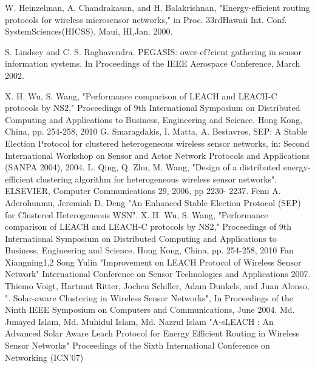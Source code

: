 \documentclass[journal]{IEEEtran}
\begin{document}
\begin{thebibliography}{1}


W. Heinzelman, A. Chandrakasan, and H. Balakrishnan, "Energy-efficient
routing protocols for wireless microsensor networks," in Proc.
33rdHawaii Int. Conf. SystemSciences(HICSS), Maui, HI,Jan. 2000.


S. Lindsey and C. S. Raghavendra. PEGASIS: ower-ef?cient gathering in sensor information systems. In Proceedings of the IEEE Aerospace Conference, March 2002.


X. H. Wu, S. Wang, "Performance comparison of LEACH and LEACH-C protocols by NS2," Proceedings of 9th International Symposium on Distributed Computing and Applications to Business, Engineering and Science. Hong Kong, China, pp. 254-258, 2010
G. Smaragdakis, I. Matta, A. Bestavros, SEP: A Stable Election
Protocol for clustered heterogeneous wireless sensor networks, in:
Second International Workshop on Sensor and Actor Network
Protocols and Applications (SANPA 2004), 2004.
L. Qing, Q. Zhu, M. Wang, "Design of a distributed
energy-efficient clustering algorithm for heterogeneous
wireless sensor networks". ELSEVIER, Computer
Communications 29, 2006, pp 2230- 2237.
Femi A. Aderohunmu, Jeremiah D. Deng "An Enhanced Stable Election Protocol (SEP) for Clustered Heterogeneous WSN".
X. H. Wu, S. Wang, "Performance comparison of LEACH and LEACH-C protocols by NS2," Proceedings of 9th International Symposium on Distributed Computing and Applications to Business, Engineering and Science. Hong Kong, China, pp. 254-258, 2010
Fan Xiangning1,2 Song Yulin "Improvement on LEACH Protocol of Wireless Sensor Network"
International  Conference on Sensor Technologies and Applications 2007.
Thiemo Voigt, Hartmut Ritter, Jochen Schiller, Adam Dunkels, and Juan Alonso, ". Solar-aware
Clustering in Wireless Sensor Networks", In Proceedings
of the Ninth IEEE Symposium on Computers and Communications, June 2004.
 Md. Junayed Islam, Md. Muhidul Islam, Md. Nazrul Islam "A-sLEACH : An Advanced Solar Aware Leach Protocol for Energy Efficient Routing in Wireless Sensor Networks" Proceedings of the Sixth International Conference on Networking (ICN'07)


\end{thebibliography}
\end{document}
